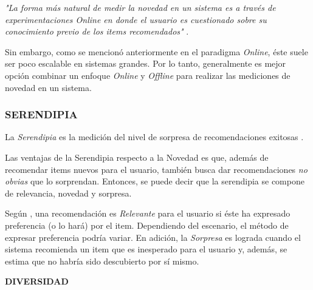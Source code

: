     \textit{"La forma más natural de medir la novedad en un sistema es a través de experimentaciones Online en donde el usuario es cuestionado sobre su conocimiento previo de los items recomendados"} \parencite{Aggarwal2016}.

    Sin embargo, como se mencionó anteriormente en el paradigma \textit{Online}, éste suele ser poco escalable en sistemas grandes. Por lo tanto, generalmente es mejor opción combinar un enfoque \textit{Online} y \textit{Offline} para realizar las mediciones de novedad en un sistema.

    \subsubsection{SERENDIPIA}

    La \textit{Serendipia} es la medición del nivel de sorpresa de recomendaciones exitosas \parencite{Aggarwal2016}. 
    
    Las ventajas de la Serendipia respecto a la Novedad es que, además de recomendar items nuevos para el usuario, también busca dar recomendaciones \textit{no obvias} que lo sorprendan. Entonces, se puede decir que la serendipia se compone de relevancia, novedad y sorpresa.
    
    Según \parencite{Kotkov2020Serendipity}, una recomendación es \textit{Relevante} para el usuario si éste ha expresado preferencia (o lo hará) por el item. Dependiendo del escenario, el método de expresar preferencia podría variar. En adición, la \textit{Sorpresa} es lograda cuando el sistema recomienda un item que es inesperado para el usuario y, además, se estima que no habría sido descubierto por sí mismo.

    \newpage

    \textbf{DIVERSIDAD}
    









